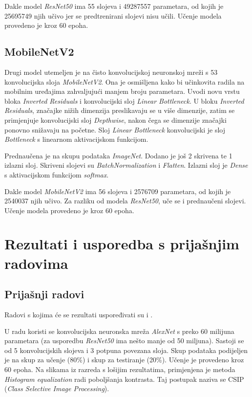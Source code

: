 \documentclass[conference, utf8]{IEEEtran}
\begin{document}
	Dakle model \textit{ResNet50} ima 55 slojeva i 49287557 parametara, od kojih je 25695749 njih učivo jer se predtrenirani slojevi nisu učili. Učenje modela provedeno je kroz 60 epoha.
	
	\subsection{MobileNetV2}
	Drugi model utemeljen je na čisto konvolucijskoj neuronskoj mreži s 53 konvolucijska sloja \textit{MobileNetV2}. Ona je osmišljena kako bi učinkovita radila na mobilnim uređajima zahvaljujući manjem broju parametara. Uvodi novu vrstu bloka \textit{Inverted Residuals} i konvolucijski sloj \textit{Linear Bottleneck}. U bloku \textit{Inverted Residuals}, značajke nižih dimenzija preslikavaju se u više dimenzije, zatim se primjenjuje konvolucijski sloj \textit{Depthwise}, nakon čega se dimenzije značajki ponovno snižavaju na početne. Sloj \textit{Linear Bottleneck} konvolucijski je sloj \textit{Bottleneck} s linearnom aktivacijskom funkcijom.
	
	Prednaučena je na skupu podataka \textit{ImageNet}. Dodano je još 2 skrivena te 1 izlazni sloj. Skriveni slojevi su  \textit{BatchNormalization} i \textit{Flatten}. Izlazni sloj je \textit{Dense} s aktivacijskom funkcijom \textit{softmax}.
	
	Dakle model \textit{MobileNetV2} ima 56 slojeva i 2576709 parametara, od kojih je 2540037 njih učivo. Za razliku od modela \textit{ResNet50}, uče se i prednaučeni slojevi. Učenje modela provedeno je kroz 60 epoha.
	
	\section{Rezultati i usporedba s prijašnjim radovima}
	\subsection{Prijašnji radovi}
	Radovi s kojima će se rezultati uspoređivati su \cite{RAD1} i \cite{RAD2}. 
	
	U radu \cite{RAD1} koristi se konvolucijska neuronska mreža \textit{AlexNet} s preko 60 milijuna parametara (za usporedbu \textit{ResNet50} ima nešto manje od 50 miljuna). Sastoji se od 5 konvolucijskih slojeva i 3 potpuna povezana sloja. Skup podataka podijeljen je na skup za učenje (80\%) i skup za testiranje (20\%). Učenje je provedeno kroz 60 epoha. Na slikama iz razreda s lošijim rezultatima,  primjenjena je metoda \textit{Histogram equalization} radi poboljšanja kontrasta. Taj postupak naziva se CSIP (\textit{Class Selective Image Processing}).
	
\end{document}
